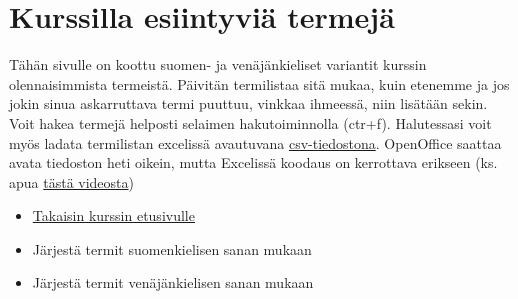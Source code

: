 \section{Kurssilla esiintyviä
termejä}\label{kurssilla-esiintyviuxe4-termejuxe4}

Tähän sivulle on koottu suomen- ja venäjänkieliset variantit kurssin
olennaisimmista termeistä. Päivitän termilistaa sitä mukaa, kuin
etenemme ja jos jokin sinua askarruttava termi puuttuu, vinkkaa
ihmeessä, niin lisätään sekin. Voit hakea termejä helposti selaimen
hakutoiminnolla (ctr+f). Halutessasi voit myös ladata termilistan
excelissä avautuvana \href{data/termit.csv}{csv-tiedostona}. OpenOffice
saattaa avata tiedoston heti oikein, mutta Excelissä koodaus on
kerrottava erikseen (ks. apua
\href{https://youtu.be/GcYt1mJbwk4?t=29}{tästä videosta})

\begin{itemize}
\tightlist
\item
  \href{index.html}{Takaisin kurssin etusivulle}
\item
  Järjestä termit suomenkielisen sanan mukaan
\item
  Järjestä termit venäjänkielisen sanan mukaan
\end{itemize}

